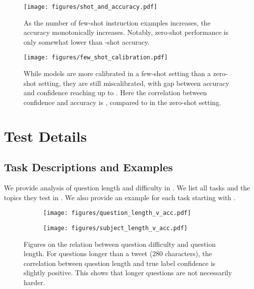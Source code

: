 \documentclass{article} \usepackage{iclr2021_conference, times}
\begin{document}
\clearpage
\newpage

\begin{figure}[h]
\begin{minipage}{.49\textwidth}
\centering
    \texttt{[image: figures/shot\_and\_accuracy.pdf]}
    \caption{As the number of few-shot instruction examples increases, the accuracy monotonically increases. Notably, zero-shot performance is only somewhat lower than -shot accuracy.}\label{fig:kandacc}\end{minipage}\hfill \begin{minipage}{.49\textwidth}
\centering
    \texttt{[image: figures/few\_shot\_calibration.pdf]}
    \caption{While models are more calibrated in a few-shot setting than a zero-shot setting, they are still miscalibrated, with gap between accuracy and confidence reaching up to . Here the correlation between confidence and accuracy is , compared to  in the zero-shot setting.}\label{fig:fewshotcalibration}
\end{minipage}
\end{figure}

















\section{Test Details}\label{app:fulllist}
\subsection{Task Descriptions and Examples}
We provide analysis of question length and difficulty in . We list all tasks and the topics they test in . We also provide an example for each task starting with .


\begin{figure}[h]
\begin{subfigure}{.49\textwidth}
\centering
    \texttt{[image: figures/question\_length\_v\_acc.pdf]}
\end{subfigure}\hfill \begin{subfigure}{.49\textwidth}
\centering
    \texttt{[image: figures/subject\_length\_v\_acc.pdf]}
\end{subfigure}
\caption{Figures on the relation between question difficulty and question length.
For questions longer than a tweet (280 characters), the correlation between question length and true label confidence is slightly positive. This shows that longer questions are not necessarily harder.
}\label{fig:length}
\end{figure}
\end{document}
